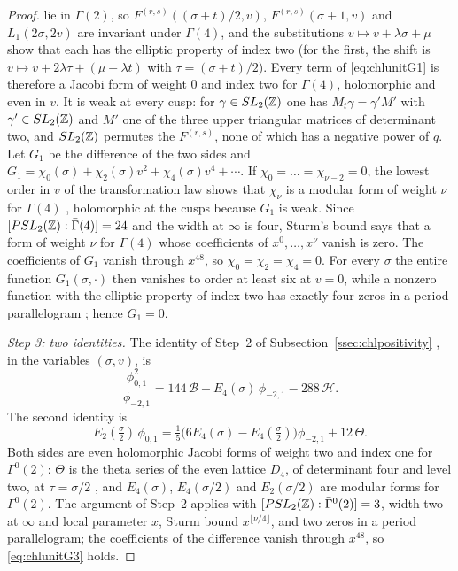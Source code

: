 \begin{proof}
lie in $\Gamma(2)$, so $F^{(r,s)}((\sigma+t)/2,v)$, $F^{(r,s)}(\sigma+1,v)$ and $L_1(2\sigma,2v)$ are invariant under $\Gamma(4)$, and the substitutions $v\mapsto v+\lambda\sigma+\mu$ show that each has the elliptic property of index two (for the first, the shift is $v\mapsto v+2\lambda\tau+(\mu-\lambda t)$ with $\tau=(\sigma+t)/2$). Every term of \eqref{eq:chlunitG1} is therefore a Jacobi form of weight $0$ and index two for $\Gamma(4)$, holomorphic and even in $v$. It is weak at every cusp: for $\gamma\in SL_2(\mathbb{Z})$ one has $M_t\gamma=\gamma'M'$ with $\gamma'\in SL_2(\mathbb{Z})$ and $M'$ one of the three upper triangular matrices of determinant two, and $SL_2(\mathbb{Z})$ permutes the $F^{(r,s)}$, none of which has a negative power of $q$. Let $G_1$ be the difference of the two sides and $G_1=\chi_0(\sigma)+\chi_2(\sigma)v^2+\chi_4(\sigma)v^4+\cdots$. If $\chi_0=\dots=\chi_{\nu-2}=0$, the lowest order in $v$ of the transformation law shows that $\chi_\nu$ is a modular form of weight $\nu$ for $\Gamma(4)$ \cite[\S3]{EZ85}, holomorphic at the cusps because $G_1$ is weak. Since $[PSL_2(\mathbb{Z}):\bar\Gamma(4)]=24$ and the width at $\infty$ is four, Sturm's bound \cite{Sturm87} says that a form of weight $\nu$ for $\Gamma(4)$ whose coefficients of $x^0,\dots,x^\nu$ vanish is zero. The coefficients of $G_1$ vanish through $x^{48}$, so $\chi_0=\chi_2=\chi_4=0$. For every $\sigma$ the entire function $G_1(\sigma,\cdot)$ then vanishes to order at least six at $v=0$, while a nonzero function with the elliptic property of index two has exactly four zeros in a period parallelogram \cite[Theorem~1.2]{EZ85}; hence $G_1=0$.

\emph{Step 3: two identities.} The identity of Step~2 of Subsection~\ref{ssec:chlpositivity} \cite[Section~3]{BringmannMurthy13}, in the variables $(\sigma,v)$, is
\begin{equation}\label{eq:chlunitBM}
\frac{\phi_{0,1}^2}{\phi_{-2,1}}=144\,\mathcal B+E_4(\sigma)\,\phi_{-2,1}-288\,\mathcal H .
\end{equation}
The second identity is
\begin{equation}\label{eq:chlunitG3}
E_2(\tfrac\sigma2)\,\phi_{0,1}=\tfrac15\big(6E_4(\sigma)-E_4(\tfrac\sigma2)\big)\phi_{-2,1}+12\,\Theta .
\end{equation}
Both sides are even holomorphic Jacobi forms of weight two and index one for $\Gamma^0(2)$: $\Theta$ is the theta series of the even lattice $D_4$, of determinant four and level two, at $\tau=\sigma/2$ \cite[\S7]{EZ85}, and $E_4(\sigma)$, $E_4(\sigma/2)$ and $E_2(\sigma/2)$ are modular forms for $\Gamma^0(2)$. The argument of Step~2 applies with $[PSL_2(\mathbb{Z}):\bar\Gamma^0(2)]=3$, width two at $\infty$ and local parameter $x$, Sturm bound $x^{\lfloor\nu/4\rfloor}$, and two zeros in a period parallelogram; the coefficients of the difference vanish through $x^{48}$, so \eqref{eq:chlunitG3} holds.


\end{proof}
